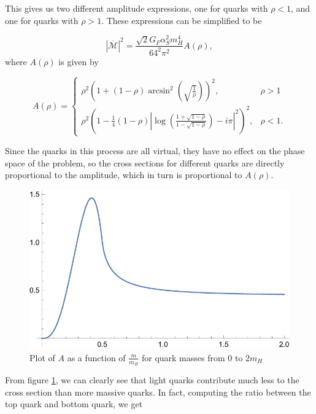 \documentclass[EPJ,twocolumn]{webofc}
\begin{document}
This gives us two different amplitude expressions, one for quarks with $\rho<1$, and one for quarks with $\rho>1$. These expressions can be simplified to be



\begin{equation}
    |\overline{\mathcal{M}}|^2 = \frac{\sqrt{2}G_F\alpha_S^2m_H^4}{64^2\pi^2}A\left(\rho\right),
    \label{FullAmpSquare}
\end{equation}
where $A\left(\rho\right)$ is given by

\begin{equation}
    A\left(\rho\right) = \begin{cases}
    
            \rho^2\left( 1+(1-\rho)\arcsin^2{\left(\sqrt{\frac{1}{\rho}} \right)}\right)^2  ,& \rho > 1  \\
            
            \rho^2\left( 1-\frac{1}{4}(1-\rho)\left| \log\left( \frac{1+\sqrt{1-\rho}}{1-\sqrt{1-\rho}}\right)-i\pi \right|^2\right)^2,& \rho  < 1 .
            \end{cases}
\end{equation}

Since the quarks in this process are all virtual, they have no effect on the phase space of the problem, so the cross sections for different quarks are directly proportional to the amplitude, which in turn is proportional to $A\left(\rho\right)$.

\begin{figure}[ht]
    \centering
    \includegraphics[width=.6\columnwidth]{Images/f(p).pdf}
    \caption{Plot of $A$ as a function of $\frac{m}{m_H}$ for quark masses from $0$ to $2m_H$ }
    \label{fp}
\end{figure}
From figure \ref{fp}, we can clearly see that light quarks contribute much less to the cross section than more massive quarks. In fact, computing the ratio between the top quark and bottom quark, we get
\end{document}
